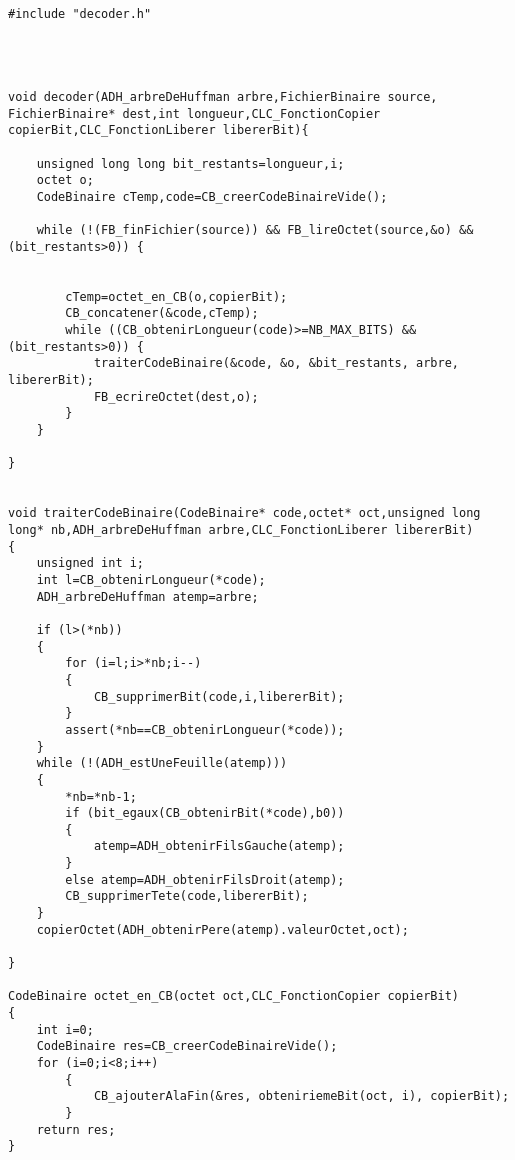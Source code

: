 \begin{verbatim}

#include "decoder.h"




void decoder(ADH_arbreDeHuffman arbre,FichierBinaire source, FichierBinaire* dest,int longueur,CLC_FonctionCopier copierBit,CLC_FonctionLiberer libererBit){

	unsigned long long bit_restants=longueur,i;
	octet o;
	CodeBinaire cTemp,code=CB_creerCodeBinaireVide();

	while (!(FB_finFichier(source)) && FB_lireOctet(source,&o) && (bit_restants>0)) {
		
	
		cTemp=octet_en_CB(o,copierBit);		
		CB_concatener(&code,cTemp);
		while ((CB_obtenirLongueur(code)>=NB_MAX_BITS) && (bit_restants>0)) {
			traiterCodeBinaire(&code, &o, &bit_restants, arbre, libererBit);
			FB_ecrireOctet(dest,o);
		}
	}

}


void traiterCodeBinaire(CodeBinaire* code,octet* oct,unsigned long long* nb,ADH_arbreDeHuffman arbre,CLC_FonctionLiberer libererBit)
{
	unsigned int i;
	int l=CB_obtenirLongueur(*code);
	ADH_arbreDeHuffman atemp=arbre;

	if (l>(*nb))
	{
		for (i=l;i>*nb;i--)
		{
			CB_supprimerBit(code,i,libererBit);
		}
		assert(*nb==CB_obtenirLongueur(*code));
	}
	while (!(ADH_estUneFeuille(atemp)))
	{
		*nb=*nb-1;
		if (bit_egaux(CB_obtenirBit(*code),b0))
		{
			atemp=ADH_obtenirFilsGauche(atemp);
		}
		else atemp=ADH_obtenirFilsDroit(atemp);
		CB_supprimerTete(code,libererBit);
	}
	copierOctet(ADH_obtenirPere(atemp).valeurOctet,oct);

}

CodeBinaire octet_en_CB(octet oct,CLC_FonctionCopier copierBit)
{
	int i=0;
	CodeBinaire res=CB_creerCodeBinaireVide();
	for (i=0;i<8;i++)
		{
			CB_ajouterAlaFin(&res, obteniriemeBit(oct, i), copierBit);
		}
	return res;
}

\end{verbatim}
 
